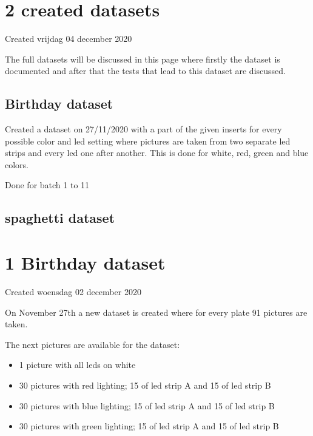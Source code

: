 		\section{2 created datasets}

Created vrijdag 04 december 2020



The full datasets will be discussed in this page where firstly the dataset is documented and after that the tests that lead to this dataset are discussed.



\subsection{Birthday dataset}

Created a dataset on 27/11/2020 with a part of the given inserts for every possible color and led setting where pictures are taken from two separate led strips and every led one after another. This is done for white, red, green and blue colors. 

Done for batch 1 to 11





\subsection{spaghetti dataset}


		\section{1 Birthday dataset}

Created woensdag 02 december 2020





On November 27th a new dataset is created where for every plate 91 pictures are taken. 



The next pictures are available for the dataset:

\begin{itemize}
\item 1 picture with all leds on white
\item 30 pictures with red lighting; 15 of led strip A and 15 of led strip B
\item 30 pictures with blue lighting; 15 of led strip A and 15 of led strip B
\item 30 pictures with green lighting; 15 of led strip A and 15 of led strip B
\end{itemize}


